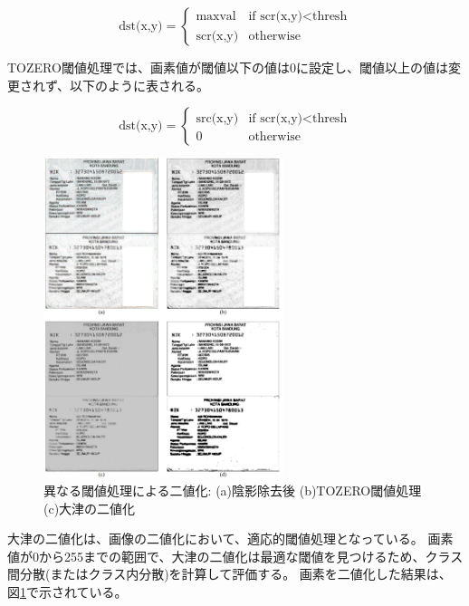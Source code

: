 \documentclass[uplatex, twocolumn,10pt]{jsarticle}
\begin{document}
\begin{equation}
    \text{dst(x,y)} =
    \left\{
    \begin{array}{ll}
        \text{maxval}   & \text{if scr(x,y)} < \text{thresh} \\
        \text{scr(x,y)} & \text{otherwise}
    \end{array}
    \right.
\end{equation}

TOZERO閾値処理では、画素値が閾値以下の値は0に設定し、閾値以上の値は変更されず、以下のように表される。

\begin{equation}
    \text{dst(x,y)} =
    \left\{
    \begin{array}{ll}
        \text{src(x,y)} & \text{if scr(x,y)} < \text{thresh} \\
        0               & \text{otherwise}
    \end{array}
    \right.
\end{equation}


\begin{figure}[t]
    \begin{center}
        \includegraphics*[width=7cm]{image/Figure3.png}
        \caption{異なる閾値処理による二値化: (a)陰影除去後 (b)TOZERO閾値処理 (c)大津の二値化}
        \label{fig:Figure3}
    \end{center}
\end{figure}

大津の二値化は、画像の二値化において、適応的閾値処理となっている。
画素値が0から255までの範囲で、大津の二値化は最適な閾値を見つけるため、クラス間分散(またはクラス内分散)を計算して評価する。
画素を二値化した結果は、図\ref{fig:Figure3}で示されている。
\end{document}
